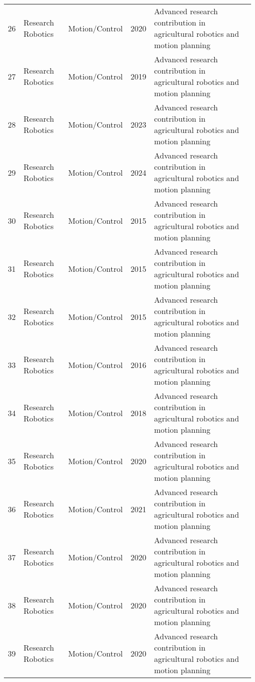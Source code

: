 \begin{table*}[htbp]
\begin{tabular}{p{}p{}p{}p{}p{}p{}}
 26 & Research Robotics & Motion/Control & 2020 & Advanced research contribution in agricultural robotics and motion planning & \cite{liu2020yolo} \\
 27 & Research Robotics & Motion/Control & 2019 & Advanced research contribution in agricultural robotics and motion planning & \cite{Loganathan:2019} \\
 28 & Research Robotics & Motion/Control & 2023 & Advanced research contribution in agricultural robotics and motion planning & \cite{Loganathan:2023_hho} \\
 29 & Research Robotics & Motion/Control & 2024 & Advanced research contribution in agricultural robotics and motion planning & \cite{Loganathan:2024_hho_avoa} \\
 30 & Research Robotics & Motion/Control & 2015 & Advanced research contribution in agricultural robotics and motion planning & \cite{longsheng2015development} \\
 31 & Research Robotics & Motion/Control & 2015 & Advanced research contribution in agricultural robotics and motion planning & \cite{longsheng2015kiwifruit} \\
 32 & Research Robotics & Motion/Control & 2015 & Advanced research contribution in agricultural robotics and motion planning & \cite{lu2015detecting} \\
 33 & Research Robotics & Motion/Control & 2016 & Advanced research contribution in agricultural robotics and motion planning & \cite{luo2016vision} \\
 34 & Research Robotics & Motion/Control & 2018 & Advanced research contribution in agricultural robotics and motion planning & \cite{luo2018vision} \\
 35 & Research Robotics & Motion/Control & 2020 & Advanced research contribution in agricultural robotics and motion planning & \cite{luo2020identifying} \\
 36 & Research Robotics & Motion/Control & 2021 & Advanced research contribution in agricultural robotics and motion planning & \cite{magalhaes2021evaluating} \\
 37 & Research Robotics & Motion/Control & 2020 & Advanced research contribution in agricultural robotics and motion planning & \cite{mahmud2020robotics} \\
 38 & Research Robotics & Motion/Control & 2020 & Advanced research contribution in agricultural robotics and motion planning & \cite{majeed2020deep} \\
 39 & Research Robotics & Motion/Control & 2020 & Advanced research contribution in agricultural robotics and motion planning & \cite{mao2020automatic} \\

\end{tabular}
\end{table*}
